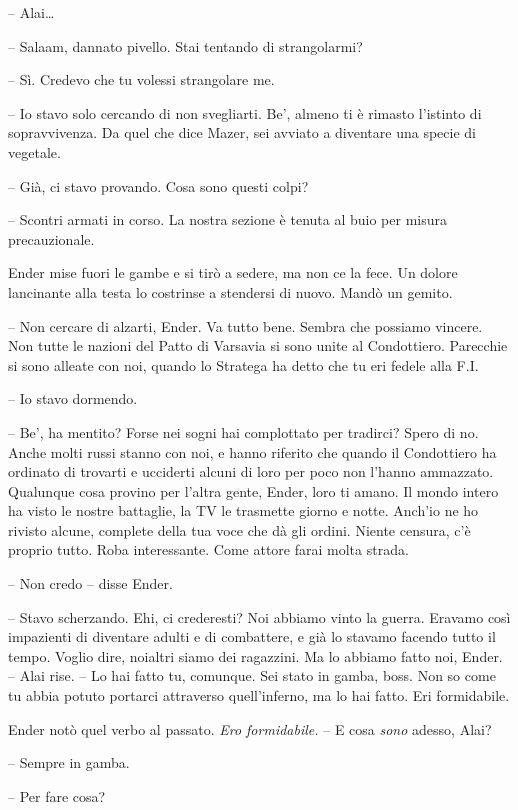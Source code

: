 {-- Alai\ldots{}}

{-- Salaam, dannato pivello. Stai tentando di strangolarmi?}

{-- Sì. Credevo che tu volessi strangolare me.}

{-- Io stavo solo cercando di non svegliarti. Be', almeno ti è rimasto
	l'istinto di sopravvivenza. Da quel che dice Mazer, sei avviato a
	diventare una specie di vegetale.}

{-- Già, ci stavo provando. Cosa sono questi colpi?}

{-- Scontri armati in corso. La nostra sezione è tenuta al buio per
	misura precauzionale.}

{Ender mise fuori le gambe e si tirò a sedere, ma non ce la fece. Un
	dolore lancinante alla testa lo costrinse a stendersi di nuovo. Mandò un
	gemito.}

{-- Non cercare di alzarti, Ender. Va tutto bene. Sembra che possiamo
	vincere. Non tutte le nazioni del Patto di Varsavia si sono unite al
	Condottiero. Parecchie si sono alleate con noi, quando lo Stratega ha
	detto che tu eri fedele alla F.I.}

{-- Io stavo dormendo.}

{-- Be', ha mentito? Forse nei sogni hai complottato per tradirci? Spero
	di no. Anche molti russi stanno con noi, e hanno riferito che quando il
	Condottiero ha ordinato di trovarti e ucciderti alcuni di loro per poco
	non l'hanno ammazzato. Qualunque cosa provino per l'altra gente, Ender,
	loro ti amano. Il mondo intero ha visto le nostre battaglie, la TV le
	trasmette giorno e notte. Anch'io ne ho rivisto alcune, complete della
	tua voce che dà gli ordini. Niente censura, c'è proprio tutto. Roba
	interessante. Come attore farai molta strada.}

{-- Non credo -- disse Ender.}

{-- Stavo scherzando. Ehi, ci crederesti? Noi abbiamo vinto la guerra.
	Eravamo così impazienti di diventare adulti e di combattere, e già lo
	stavamo facendo tutto il tempo. Voglio dire, noialtri siamo dei
	ragazzini. Ma lo abbiamo fatto noi, Ender. -- Alai rise. -- Lo hai fatto
	tu, comunque. Sei stato in gamba, boss. Non so come tu abbia potuto
	portarci attraverso quell'inferno, ma lo hai fatto. Eri formidabile.}

{Ender notò quel verbo al passato. \emph{Ero formidabile.} -- E cosa
	\emph{sono} adesso, Alai?}

{-- Sempre in gamba.}

{-- Per fare cosa?}

